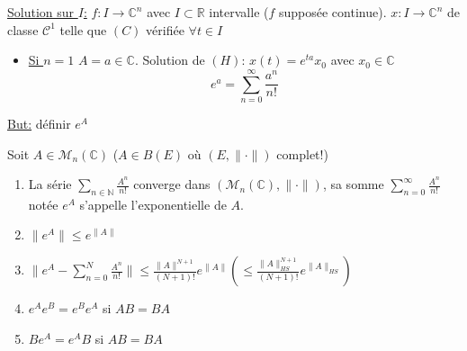 \documentclass[a4paper]{report}
\newcommand\N{\ensuremath{\mathbb{N}}}
\newcommand\R{\ensuremath{\mathbb{R}}}
\theoremstyle{definition}
\begin{document}
\underline{Solution sur $I$:} $f: I \to \mathbb{C}^n$ avec $I \subset \R$ intervalle ($f$ supposée continue). $x: I \to  \mathbb{C}^n$ de classe $\mathcal{C}^1$ telle que  $(C)$ vérifiée  $\forall t \in I$
\begin{itemize}
    \item  \underline{Si $n=1$} $A = a \in  \mathbb{C}$. Solution de $(H)$:  $x(t) = e^{ta}x_0$ avec $x_0 \in \mathbb{C}$ 
        \[
            e^{a} = \sum_{n=0}^{\infty} \frac{a^n}{n!}
        \] 
\end{itemize}
\underline{But:} définir $e^A$
 \begin{theorem}
     Soit $A \in \mathcal{M}_n(\mathbb{C})$ ($A \in B(E)$ où $(E, \| \cdot \|)$ complet!)
     \begin{enumerate}
         \item La série $\sum_{n \in \N}^{} \frac{A^n}{n!}$ converge dans $(\mathcal{M}_n(\mathbb{C}), \| \cdot \|)$, sa somme  $\sum_{n=0}^{\infty} \frac{A^n}{n!}$ notée $e^A$ s'appelle l'exponentielle de  $A$.
         \item  $\|e^A\| \le e^{\|A\|}$
         \item $\|e^A - \sum_{n=0}^{N} \frac{A^n}{n!}\| \le \frac{\|A\|^{N+1}}{(N+1)!}e^{\|A\|} (\le \frac{\|A\|_{HS}^{N+1}}{(N+1)!}e^{\|A\|_{HS}})$ 
         \item $e^Ae^B = e^Be^A$ si  $AB=BA$
         \item  $Be^A = e^AB$ si  $AB=BA$
     \end{enumerate}
\end{theorem}
\end{document}

